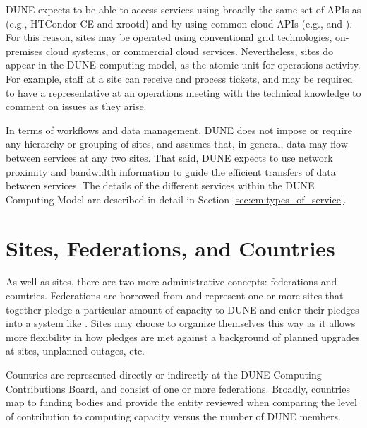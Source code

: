\documentclass[../main-v1.tex]{subfiles}
\begin{document}
DUNE expects to be able to access services using broadly the same set of APIs as  (e.g., HTCondor-CE and xrootd) and by using common cloud APIs (e.g.,  and ). 
For this reason, sites may be operated using conventional grid technologies, on-premises cloud systems, or commercial cloud services. Nevertheless, sites do appear in the DUNE computing model, as the atomic unit for operations activity. %
For example, staff at a site can receive and process tickets, %
and may be required to have a representative at an operations meeting with the technical knowledge to comment on issues as they arise.

In terms of workflows and data management, DUNE does not impose or require any hierarchy or grouping of sites, and assumes that, in general, data may flow between services at any two sites. That said, DUNE expects to use network proximity and bandwidth information to guide the efficient transfers of data between services. The details of the different services within the DUNE Computing Model are described in detail in Section \ref{sec:cm:types_of_service}.

\section{Sites, Federations, and Countries}
\label{sec:cm:federations}

As well as sites, there are two more administrative concepts: federations and countries.
Federations are borrowed from  and represent one or more sites that together pledge a particular amount of capacity to DUNE and enter their pledges into a system like . %
Sites may choose to organize themselves this way as it allows more flexibility in how pledges are met against a background of planned upgrades at sites, unplanned outages, etc. 

Countries are represented directly or indirectly at the DUNE Computing Contributions Board, and consist of one or more federations. Broadly, countries map to funding bodies and %
provide the entity reviewed when comparing the level of contribution to computing capacity versus the number of DUNE members. %
\end{document}

